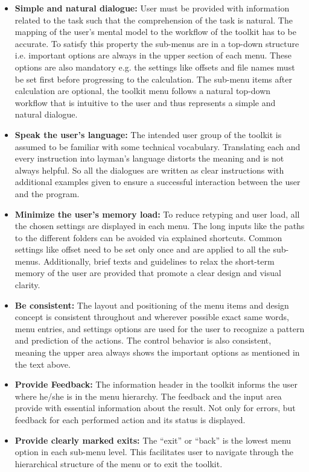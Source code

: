\begin{itemize}
	\item \textbf{Simple and natural dialogue:} User must be provided with information related to the task such that the comprehension of the task is natural. The mapping of the user's mental model to the workflow of the toolkit has to be accurate. To satisfy this property the sub-menus are in a top-down structure i.e. important options are always in the upper section of each menu. These options are also mandatory e.g. the settings like offsets and file names must be set first before
		progressing to the calculation. The sub-menu items after calculation are optional, the toolkit menu follows a natural top-down workflow that is intuitive to the user and thus represents a simple and natural dialogue.
	\item \textbf{Speak the user's language:} The intended user group of the toolkit is assumed to be familiar with some technical vocabulary. Translating each and every instruction into layman's language distorts the meaning and is not always helpful. So all the dialogues are written as clear instructions with additional examples given to ensure a successful interaction between the user and the program.
	\item \textbf{Minimize the user's memory load:} To reduce retyping and user load, all the chosen settings are displayed in each menu. The long inputs like the paths to the different folders can be avoided via explained shortcuts. Common settings like offset need to be set only once and are applied to all the sub-menus. Additionally, brief texts and guidelines to relax the short-term memory of the user are provided that promote a clear design and visual clarity.
	\item \textbf{Be consistent:} The layout and positioning of the menu items and design concept is consistent throughout and wherever possible exact same words, menu entries, and settings options are used for the user to recognize a pattern and prediction of the actions. The control behavior is also consistent, meaning the upper area always shows the important options as mentioned in the text above.
	\item \textbf{Provide Feedback:} The information header in the toolkit informs the user where he/she is in the menu hierarchy. The feedback and the input area provide with essential information about the result. Not only for errors, but feedback for each performed action and its status is displayed.
	\item \textbf{Provide clearly marked exits:} The ``exit'' or ``back'' is the lowest menu option in each sub-menu level. This facilitates user to navigate through the hierarchical structure of the menu or to exit the toolkit.

\end{itemize}
